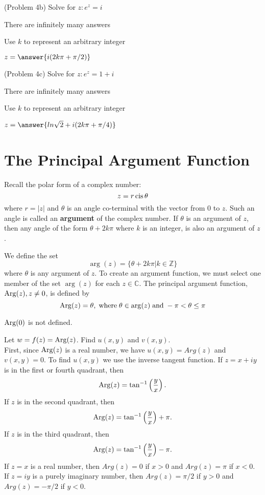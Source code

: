 \documentclass[handout]{ximera}
\begin{document}
\begin{problem}(Problem 4b)
Solve for $z: e^z = i$\\
\begin{hint}
There are infinitely many answers
\end{hint}
\begin{hint}
Use $k$ to represent an arbitrary integer
\end{hint}
$z = \answer{i(2k\pi + \pi/2)}$
\end{problem}


\begin{problem}(Problem 4c)
Solve for $z: e^z = 1+i$\\
\begin{hint}
There are infinitely many answers
\end{hint}
\begin{hint}
Use $k$ to represent an arbitrary integer
\end{hint}
$z = \answer{ln \sqrt 2 +i(2k\pi + \pi/4)}$
\end{problem}


\section{The Principal Argument Function}

Recall the polar form of a complex number:
\[
z = r\operatorname{cis}\theta
\]
where $r = |z|$ and $\theta$ is an angle co-terminal with the vector from $0$ to $z$. Such an angle is called an {\bf argument}
of the complex number. If $\theta$ is an argument of $z$, then any angle of the form $\theta +2k\pi$ where $k$ is an integer, is also an argument of $z$.

We define the set
\[
\arg(z) = \{\theta + 2k\pi | k \in \mathbb{Z}\}
\]
where $\theta$ is any argument of $z$.
To create an argument function, we must select one member of the set $\arg(z)$ for each $z \in \mathbb{C}$.
The principal argument function, $\operatorname{Arg}(z), z \neq 0$, is defined by
\[
\operatorname{Arg}(z) = \theta, \;\mbox{where}\; \theta\in\arg(z)\;\mbox{and}\; -\pi < \theta \leq \pi
\]

\begin{remark}
$\operatorname{Arg}(0)$ is not defined.
\end{remark}

\begin{example}[Example 5] 
Let $w = f(z) = \operatorname{Arg}(z)$. Find $u(x,y)$ and $v(x,y)$.\\ 
First, since $\operatorname{Arg}(z)$ is a real number, we have $u(x,y) = Arg(z)$ and $v(x,y) = 0$.
To find $u(x,y)$ we use the inverse tangent function.
If $z=x+iy$ is in the first or fourth quadrant, then 
\[
\operatorname{Arg}(z) = \tan^{-1}\left(\frac{y}{x}\right).
\]
If $z$ is in the second quadrant, then 
\[
\operatorname{Arg}(z) = \tan^{-1}\left(\frac{y}{x}\right) + \pi.
\]
If $z$ is in the third quadrant, then 
\[
\operatorname{Arg}(z) = \tan^{-1}\left(\frac{y}{x}\right) - \pi.
\]
If $z =x$ is a real number, then $Arg(z) = 0$ if $x>0$ and  $Arg(z) = \pi$ if $x<0$.\\
If $z = iy$ is a purely imaginary number, then $Arg(z) = \pi/2$ if $y>0$ and $Arg(z) = -\pi/2$ if $y<0$.
\end{example}
\end{document}
